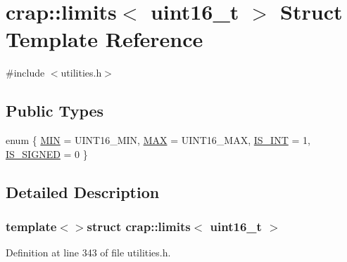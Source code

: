 \hypertarget{structcrap_1_1limits_3_01uint16__t_01_4}{\section{crap\+:\+:limits$<$ uint16\+\_\+t $>$ Struct Template Reference}
\label{structcrap_1_1limits_3_01uint16__t_01_4}
}


{\ttfamily \#include $<$utilities.\+h$>$}

\subsection*{Public Types}
\begin{DoxyCompactItemize}
\item 
enum \{ \hyperlink{structcrap_1_1limits_3_01uint16__t_01_4_a0ce31f31cf647c6d9a7ba3a7c504b170a2d5ba59562182999fa680807805f9b02}{M\+I\+N} = U\+I\+N\+T16\+\_\+\+M\+I\+N, 
\hyperlink{structcrap_1_1limits_3_01uint16__t_01_4_a0ce31f31cf647c6d9a7ba3a7c504b170ace042d7de7c9dbe8c168a8aa6ed6dff8}{M\+A\+X} = U\+I\+N\+T16\+\_\+\+M\+A\+X, 
\hyperlink{structcrap_1_1limits_3_01uint16__t_01_4_a0ce31f31cf647c6d9a7ba3a7c504b170ad2448a3c8dcbb917b93e0df0f48caa43}{I\+S\+\_\+\+I\+N\+T} = 1, 
\hyperlink{structcrap_1_1limits_3_01uint16__t_01_4_a0ce31f31cf647c6d9a7ba3a7c504b170afa01cb0a38841bacb8f892fd5f82bf5b}{I\+S\+\_\+\+S\+I\+G\+N\+E\+D} = 0
 \}
\end{DoxyCompactItemize}


\subsection{Detailed Description}
\subsubsection*{template$<$$>$struct crap\+::limits$<$ uint16\+\_\+t $>$}



Definition at line 343 of file utilities.\+h.



